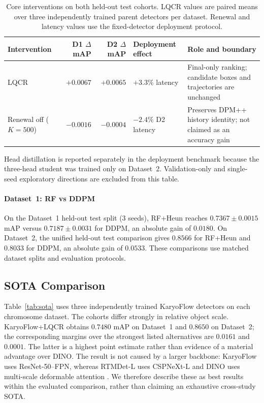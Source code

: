 \documentclass[journal,10pt]{IEEEtran}
\theoremstyle{definition}
\newcommand{\mAP}{\ensuremath{\mathrm{mAP}}}
\begin{document}
\begin{table}[t]
  \centering
  \small
  \caption{Core interventions on both held-out test cohorts. LQCR values are
  paired means over three independently trained parent detectors per dataset.
  Renewal and latency values use the fixed-detector deployment protocol.}
  \label{tab:engineering-evidence}
  \begin{tabular}{lrrp{3.0cm}p{6.0cm}}
    \toprule
    Intervention & D1 $\Delta$mAP & D2 $\Delta$mAP & Deployment effect & Role and boundary \\
    \midrule
    LQCR & $+0.0067$ & $+0.0065$ & $+3.3\%$ latency & Final-only ranking; candidate boxes and trajectories are unchanged \\
    Renewal off ($K=500$) & $-0.0016$ & $-0.0004$ & $-2.4\%$ D2 latency & Preserves DPM++ history identity; not claimed as an accuracy gain \\
    \bottomrule
  \end{tabular}
\end{table}

Head distillation is reported separately in the deployment benchmark because
the three-head student was trained only on Dataset~2. Validation-only and
single-seed exploratory directions are excluded from this table.

\paragraph{Dataset~1: RF vs DDPM}
On the Dataset~1 held-out test split (3 seeds), RF+Heun reaches
$0.7367\pm0.0015$ \mAP{} versus $0.7187\pm0.0031$ for DDPM, an absolute
gain of $0.0180$. On Dataset~2, the unified held-out test comparison gives
$0.8566$ for RF+Heun and $0.8033$ for DDPM, an absolute gain of $0.0533$.
These comparisons use matched dataset splits and evaluation protocols.

\subsection{SOTA Comparison}\label{sec:exp-sota}

Table~\ref{tab:sota} uses three independently trained KaryoFlow detectors on
each chromosome dataset. The cohorts differ strongly in relative object scale.
KaryoFlow+LQCR obtains $0.7480$ mAP on Dataset~1 and $0.8650$ on Dataset~2;
the corresponding margins over the strongest listed alternatives are $0.0161$
and $0.0001$. The latter is a highest point estimate rather than evidence of a
material advantage over DINO. The
result is not caused by a larger backbone: KaryoFlow uses ResNet-50--FPN,
whereas RTMDet-L uses CSPNeXt-L and DINO uses multi-scale deformable attention
\cite{lyu2022rtmdet,zhang2023dino}. We therefore describe these as best results
within the evaluated comparison, rather than claiming an exhaustive
cross-study SOTA.
\end{document}
